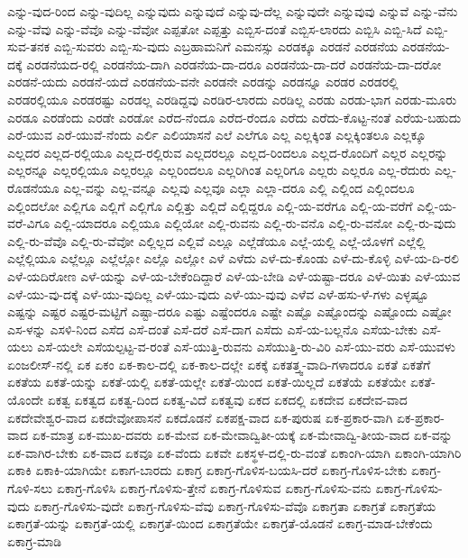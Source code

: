 {ಎನ್ನು-ವುದ-ರಿಂದ
ಎನ್ನು-ವುದಿಲ್ಲ
ಎನ್ನುವುದು
ಎನ್ನುವುದೆ
ಎನ್ನುವು-ದೆಲ್ಲ
ಎನ್ನುವುದೇ
ಎನ್ನುವುವು
ಎನ್ನುವೆ
ಎನ್ನು-ವೆನು
ಎನ್ನು-ವೆವು
ಎನ್ನು-ವೆವೊ
ಎನ್ನು-ವೆವೋ
ಎಪ್ಪತೋ
ಎಪ್ಪತ್ತು
ಎಬ್ಬಿಸ-ದಂತೆ
ಎಬ್ಬಿಸ-ಲಾರದು
ಎಬ್ಬಿಸಿ
ಎಬ್ಬಿ-ಸಿದೆ
ಎಬ್ಬಿ-ಸುವ-ತನಕ
ಎಬ್ಬಿ-ಸುವರು
ಎಬ್ಬಿ-ಸು-ವುದು
ಎಬ್ರಹಾಮನಿಗೆ
ಎಮನಸ್ಸು
ಎರಡಕ್ಕೂ
ಎರಡನೆ
ಎರಡನೆಯ
ಎರಡನೆಯ-ದಕ್ಕೆ
ಎರಡನೆಯದ-ರಲ್ಲಿ
ಎರಡನೆಯ-ದಾಗಿ
ಎರಡನೆಯ-ದಾ-ದರೂ
ಎರಡನೆಯ-ದಾ-ದರೆ
ಎರಡನೆಯ-ದಾ-ದರೋ
ಎರಡನೆ-ಯದು
ಎರಡನೆ-ಯದೆ
ಎರಡನೆಯ-ವನೇ
ಎರಡನೇ
ಎರಡನ್ನು
ಎರಡನ್ನೂ
ಎರಡರ
ಎರಡರಲ್ಲಿ
ಎರಡರಲ್ಲಿಯೂ
ಎರಡರಷ್ಟು
ಎರಡಲ್ಲ
ಎರಡಿದ್ದವು
ಎರಡಿರ-ಲಾರದು
ಎರಡಿಲ್ಲ
ಎರಡು
ಎರಡು-ಭಾಗ
ಎರಡು-ಮೂರು
ಎರಡೂ
ಎರಡೆಂದು
ಎರಡೇ
ಎರಡೋ
ಎರೆದ-ನೆಂದೂ
ಎರೆದ-ರೆಂದೂ
ಎರೆದು
ಎರೆದು-ಕೊಟ್ಟ-ನಂತೆ
ಎರೆಯ-ಬಹುದು
ಎರೆ-ಯುವ
ಎರೆ-ಯುವೆ-ನೆಂದು
ಎರ್ಲಿ
ಎಲಿಯಾಸನೆ
ಎಲೆ
ಎಲೆಗೂ
ಎಲ್ಲ
ಎಲ್ಲಕ್ಕಿಂತ
ಎಲ್ಲಕ್ಕಿಂತಲೂ
ಎಲ್ಲಕ್ಕೂ
ಎಲ್ಲದರ
ಎಲ್ಲದ-ರಲ್ಲಿಯೂ
ಎಲ್ಲದ-ರಲ್ಲಿರುವ
ಎಲ್ಲದರಲ್ಲೂ
ಎಲ್ಲದ-ರಿಂದಲೂ
ಎಲ್ಲದ-ರೊಂದಿಗೆ
ಎಲ್ಲರ
ಎಲ್ಲರನ್ನು
ಎಲ್ಲರನ್ನೂ
ಎಲ್ಲರಲ್ಲಿಯೂ
ಎಲ್ಲರಲ್ಲೂ
ಎಲ್ಲರಿಂದಲೂ
ಎಲ್ಲರಿಗಿಂತ
ಎಲ್ಲರಿಗೂ
ಎಲ್ಲರು
ಎಲ್ಲರೂ
ಎಲ್ಲ-ರೆದುರು
ಎಲ್ಲ-ರೊಡನೆಯೂ
ಎಲ್ಲ-ವನ್ನು
ಎಲ್ಲ-ವನ್ನೂ
ಎಲ್ಲವು
ಎಲ್ಲವೂ
ಎಲ್ಲಾ
ಎಲ್ಲಾ-ದರೂ
ಎಲ್ಲಿ
ಎಲ್ಲಿಂದ
ಎಲ್ಲಿಂದಲೂ
ಎಲ್ಲಿಂದಲೋ
ಎಲ್ಲಿಗೂ
ಎಲ್ಲಿಗೆ
ಎಲ್ಲಿಗೊ
ಎಲ್ಲಿತ್ತು
ಎಲ್ಲಿದೆ
ಎಲ್ಲಿದ್ದರೂ
ಎಲ್ಲಿ-ಯ-ವರೆಗೂ
ಎಲ್ಲಿ-ಯ-ವರೆಗೆ
ಎಲ್ಲಿ-ಯ-ವರೆ-ವಿಗೂ
ಎಲ್ಲಿ-ಯಾದರೂ
ಎಲ್ಲಿಯೂ
ಎಲ್ಲಿಯೋ
ಎಲ್ಲಿ-ರುವನು
ಎಲ್ಲಿ-ರು-ವನೊ
ಎಲ್ಲಿ-ರು-ವನೋ
ಎಲ್ಲಿ-ರು-ವುದು
ಎಲ್ಲಿ-ರು-ವೆವೊ
ಎಲ್ಲಿ-ರು-ವೆವೋ
ಎಲ್ಲಿಲ್ಲದ
ಎಲ್ಲಿವೆ
ಎಲ್ಲೂ
ಎಲ್ಲೆಡೆಯೂ
ಎಲ್ಲೆ-ಯಲ್ಲಿ
ಎಲ್ಲೆ-ಯೊಳಗೆ
ಎಲ್ಲೆಲ್ಲಿ
ಎಲ್ಲೆಲ್ಲಿಯೂ
ಎಲ್ಲೆಲ್ಲೂ
ಎಲ್ಲೆಲ್ಲೋ
ಎಲ್ಲೊ
ಎಲ್ಲೋ
ಎಳೆ
ಎಳೆದು
ಎಳೆ-ದು-ಕೊಂಡು
ಎಳೆ-ದು-ಕೊಳ್ಳಿ
ಎಳೆ-ಯ-ದಿ-ರಲಿ
ಎಳೆ-ಯದಿರೋಣ
ಎಳೆ-ಯನ್ನು
ಎಳೆ-ಯ-ಬೇಕೆಂದಿದ್ದಾರೆ
ಎಳೆ-ಯ-ಬೇಡಿ
ಎಳೆ-ಯಷ್ಟಾ-ದರೂ
ಎಳೆ-ಯಿತು
ಎಳೆ-ಯುವ
ಎಳೆ-ಯು-ವು-ದಕ್ಕೆ
ಎಳೆ-ಯು-ವುದಿಲ್ಲ
ಎಳೆ-ಯು-ವುದು
ಎಳೆ-ಯು-ವುವು
ಎಳೆವ
ಎಳೆ-ಹಸು-ಳೆ-ಗಳು
ಎಳ್ಳಷ್ಟೂ
ಎಷ್ಟನ್ನು
ಎಷ್ಟರ
ಎಷ್ಟರ-ಮಟ್ಟಿಗೆ
ಎಷ್ಟಾ-ದರೂ
ಎಷ್ಟು
ಎಷ್ಟೆಂದರೂ
ಎಷ್ಟೇ
ಎಷ್ಟೊ
ಎಷ್ಟೊಂದನ್ನು
ಎಷ್ಟೊಂದು
ಎಷ್ಟೋ
ಎಸ-ಳನ್ನು
ಎಸಳಿ-ನಿಂದ
ಎಸೆದ
ಎಸೆ-ದಂತೆ
ಎಸೆ-ದರೆ
ಎಸೆ-ದಾಗ
ಎಸೆದು
ಎಸೆ-ಯ-ಬಲ್ಲನೊ
ಎಸೆಯ-ಬೇಕು
ಎಸೆ-ಯಲು
ಎಸೆ-ಯಲೇ
ಎಸೆಯಲ್ಪಟ್ಟ-ವ-ರಂತೆ
ಎಸೆ-ಯುತ್ತಿ-ರುವನು
ಎಸೆಯುತ್ತಿ-ರು-ವಿರಿ
ಎಸೆ-ಯು-ವರು
ಎಸೆ-ಯುವಳು
ಏಂಜಲೀಸ್-ನಲ್ಲಿ
ಏಕ
ಏಕಂ
ಏಕ-ಕಾಲ-ದಲ್ಲಿ
ಏಕ-ಕಾಲ-ದಲ್ಲೇ
ಏಕಕ್ಕೆ
ಏಕತತ್ತ್ವ-ವಾದಿ-ಗಳಾದರೂ
ಏಕತೆ
ಏಕತೆಗೆ
ಏಕತೆಯ
ಏಕತೆ-ಯನ್ನು
ಏಕತೆ-ಯಲ್ಲಿ
ಏಕತೆ-ಯಲ್ಲೇ
ಏಕತೆ-ಯಿಂದ
ಏಕತೆ-ಯಿಲ್ಲದೆ
ಏಕತೆಯೆ
ಏಕತೆಯೇ
ಏಕತೆ-ಯೊಂದೇ
ಏಕತ್ವ
ಏಕತ್ವದ
ಏಕತ್ವ-ದಿಂದ
ಏಕತ್ವ-ವಿದೆ
ಏಕತ್ವವು
ಏಕದ
ಏಕದಲ್ಲಿ
ಏಕದೇವ
ಏಕದೇವ-ವಾದ
ಏಕದೇವೇಶ್ವರ-ವಾದ
ಏಕದೇವೋಪಾಸನೆ
ಏಕದೊಡನೆ
ಏಕಪಕ್ಷ-ವಾದ
ಏಕ-ಪುರುಷ
ಏಕ-ಪ್ರಕಾರ-ವಾಗಿ
ಏಕ-ಪ್ರಕಾರ-ವಾದ
ಏಕ-ಮಾತ್ರ
ಏಕ-ಮುಖ-ದವರು
ಏಕ-ಮೇವ
ಏಕ-ಮೇವಾದ್ವಿತೀ-ಯಕ್ಕೆ
ಏಕ-ಮೇವಾದ್ವಿ-ತೀಯ-ವಾದ
ಏಕ-ವನ್ನು
ಏಕ-ವಾಗಿರ-ಬೇಕು
ಏಕ-ವಾದ
ಏಕವೂ
ಏಕ-ವೆಂದು
ಏಕವೇ
ಏಕಸ್ಥಳ-ದಲ್ಲಿ-ರು-ವಂತೆ
ಏಕಾಂಗಿ-ಯಾಗಿ
ಏಕಾಂಗಿ-ಯಾಗಿರಿ
ಏಕಾಕಿ
ಏಕಾಕಿ-ಯಾಗಿಯೇ
ಏಕಾಗ-ಬಾರದು
ಏಕಾಗ್ರ
ಏಕಾಗ್ರ-ಗೊಳಿಸ-ಬಯಸಿ-ದರೆ
ಏಕಾಗ್ರ-ಗೊಳಿಸ-ಬೇಕು
ಏಕಾಗ್ರ-ಗೊಳಿ-ಸಲು
ಏಕಾಗ್ರ-ಗೊಳಿಸಿ
ಏಕಾಗ್ರ-ಗೊಳಿಸು-ತ್ತೇನೆ
ಏಕಾಗ್ರ-ಗೊಳಿಸುವ
ಏಕಾಗ್ರ-ಗೊಳಿಸು-ವನು
ಏಕಾಗ್ರ-ಗೊಳಿಸು-ವುದು
ಏಕಾಗ್ರ-ಗೊಳಿಸು-ವುದೇ
ಏಕಾಗ್ರ-ಗೊಳಿಸು-ವೆವು
ಏಕಾಗ್ರ-ಗೊಳಿಸು-ವೆವೊ
ಏಕಾಗ್ರತಾ
ಏಕಾಗ್ರತೆ
ಏಕಾಗ್ರತೆಯ
ಏಕಾಗ್ರತೆ-ಯನ್ನು
ಏಕಾಗ್ರತೆ-ಯಲ್ಲಿ
ಏಕಾಗ್ರತೆ-ಯಿಂದ
ಏಕಾಗ್ರತೆಯೇ
ಏಕಾಗ್ರತೆ-ಯೊಡನೆ
ಏಕಾಗ್ರ-ಮಾಡ-ಬೇಕೆಂದು
ಏಕಾಗ್ರ-ಮಾಡಿ
}
